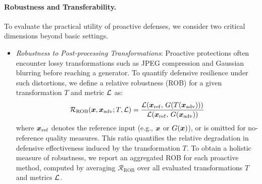\documentclass{article}
\begin{document}
\paragraph{Robustness and Transferability.}
To evaluate the practical utility of proactive defenses, we consider two critical dimensions beyond basic settings. 
\begin{itemize}[leftmargin=*, nosep]
    \item \emph{Robustness to Post-processing Transformations}: Proactive protections often encounter lossy transformations such as JPEG compression and Gaussian blurring before reaching a generator. To quantify defensive resilience under such distortions, we define a relative robustness (ROB) for a given transformation $T$ and metric ${\mathcal{L}}$ as:
    \begin{equation}
        \mathcal{R}_{\mathrm{ROB}}({\bm{x}}, {\bm{x}}_{\mathrm{adv}}; T, {\mathcal{L}}) = \frac{{\mathcal{L}}\!\left({\bm{x}}_{\mathrm{ref}},\,G\!\left(T({\bm{x}}_{\mathrm{adv}})\right)\right)}{{\mathcal{L}}\!\left({\bm{x}}_{\mathrm{ref}},\, G({\bm{x}}_{\mathrm{adv}})\right)}
    \end{equation}
    where ${\bm{x}}_{\mathrm{ref}}$ denotes the reference input (e.g., ${\bm{x}}$ or $G({\bm{x}})$), or is omitted for no-reference quality measures. This ratio quantifies the relative degradation in defensive effectiveness induced by the transformation $T$. To obtain a holistic measure of robustness, we report an aggregated ROB for each proactive method, computed by averaging $\mathcal{R}_{\mathrm{ROB}}$ over all evaluated transformations $T$ and metrics ${\mathcal{L}}$.
    

\end{itemize}
\end{document}
